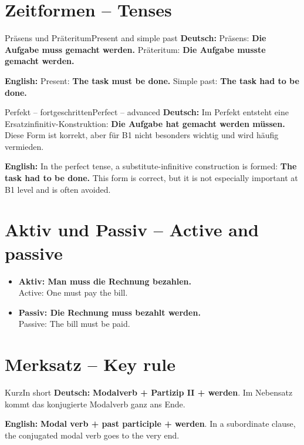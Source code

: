 \documentclass[a4paper,11pt]{article}
\newcommand{\GermanText}[1]{\textbf{Deutsch: }#1\par}
\newcommand{\EnglishText}[1]{{\small\color{SoftGray}\textbf{English: }#1\par}}
\newcommand{\ExampleItem}[2]{\item \textbf{#1}\\{\small\color{SoftGray}#2}}
\begin{document}
\section{Zeitformen -- Tenses}
\begin{grammarentry}{Präsens und Präteritum}{Present and simple past}
\GermanText{Präsens: \textbf{Die Aufgabe muss gemacht werden.} Präteritum: \textbf{Die Aufgabe musste gemacht werden.}}
\EnglishText{Present: \textbf{The task must be done.} Simple past: \textbf{The task had to be done.}}
\end{grammarentry}
\begin{grammarentry}{Perfekt -- fortgeschritten}{Perfect -- advanced}
\GermanText{Im Perfekt entsteht eine Ersatzinfinitiv-Konstruktion: \textbf{Die Aufgabe hat gemacht werden müssen.} Diese Form ist korrekt, aber für B1 nicht besonders wichtig und wird häufig vermieden.}
\EnglishText{In the perfect tense, a substitute-infinitive construction is formed: \textbf{The task had to be done.} This form is correct, but it is not especially important at B1 level and is often avoided.}
\end{grammarentry}

\section{Aktiv und Passiv -- Active and passive}
\begin{exbox}\begin{itemize}
\ExampleItem{Aktiv: Man muss die Rechnung bezahlen.}{Active: One must pay the bill.}
\ExampleItem{Passiv: Die Rechnung muss bezahlt werden.}{Passive: The bill must be paid.}
\end{itemize}\end{exbox}

\section{Merksatz -- Key rule}
\begin{grammarentry}{Kurz}{In short}
\GermanText{\textbf{Modalverb + Partizip II + werden}. Im Nebensatz kommt das konjugierte Modalverb ganz ans Ende.}
\EnglishText{\textbf{Modal verb + past participle + werden}. In a subordinate clause, the conjugated modal verb goes to the very end.}
\end{grammarentry}
\end{document}
